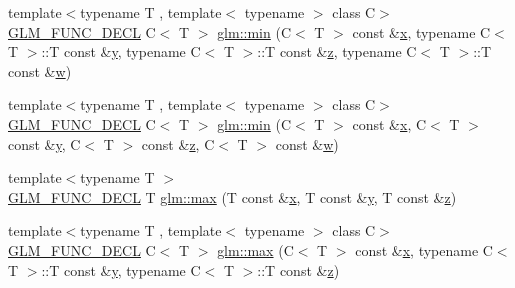 \begin{DoxyCompactItemize}
\item 
{\footnotesize template$<$typename T , template$<$ typename $>$ class C$>$ }\\\hyperlink{setup_8hpp_ab2d052de21a70539923e9bcbf6e83a51}{G\+L\+M\+\_\+\+F\+U\+N\+C\+\_\+\+D\+E\+CL} C$<$ T $>$ \hyperlink{group__gtx__extended__min__max_ga4fe35dd31dd0c45693c9b60b830b8d47}{glm\+::min} (C$<$ T $>$ const \&\hyperlink{_s_d_l__opengl_8h_ad0e63d0edcdbd3d79554076bf309fd47}{x}, typename C$<$ T $>$\+::T const \&\hyperlink{_s_d_l__opengl_8h_a1675d9d7bb68e1657ff028643b4037e3}{y}, typename C$<$ T $>$\+::T const \&\hyperlink{_s_d_l__opengl__glext_8h_a5e74030ebb3297ce1b37ff716fedd68f}{z}, typename C$<$ T $>$\+::T const \&\hyperlink{_s_d_l__opengl__glext_8h_a6ee8f168a7ab6785a9bb57c6715dad99}{w})
\item 
{\footnotesize template$<$typename T , template$<$ typename $>$ class C$>$ }\\\hyperlink{setup_8hpp_ab2d052de21a70539923e9bcbf6e83a51}{G\+L\+M\+\_\+\+F\+U\+N\+C\+\_\+\+D\+E\+CL} C$<$ T $>$ \hyperlink{group__gtx__extended__min__max_ga7471ea4159eed8dd9ea4ac5d46c2fead}{glm\+::min} (C$<$ T $>$ const \&\hyperlink{_s_d_l__opengl_8h_ad0e63d0edcdbd3d79554076bf309fd47}{x}, C$<$ T $>$ const \&\hyperlink{_s_d_l__opengl_8h_a1675d9d7bb68e1657ff028643b4037e3}{y}, C$<$ T $>$ const \&\hyperlink{_s_d_l__opengl__glext_8h_a5e74030ebb3297ce1b37ff716fedd68f}{z}, C$<$ T $>$ const \&\hyperlink{_s_d_l__opengl__glext_8h_a6ee8f168a7ab6785a9bb57c6715dad99}{w})
\item 
{\footnotesize template$<$typename T $>$ }\\\hyperlink{setup_8hpp_ab2d052de21a70539923e9bcbf6e83a51}{G\+L\+M\+\_\+\+F\+U\+N\+C\+\_\+\+D\+E\+CL} T \hyperlink{group__gtx__extended__min__max_ga04991ccb9865c4c4e58488cfb209ce69}{glm\+::max} (T const \&\hyperlink{_s_d_l__opengl_8h_ad0e63d0edcdbd3d79554076bf309fd47}{x}, T const \&\hyperlink{_s_d_l__opengl_8h_a1675d9d7bb68e1657ff028643b4037e3}{y}, T const \&\hyperlink{_s_d_l__opengl__glext_8h_a5e74030ebb3297ce1b37ff716fedd68f}{z})
\item 
{\footnotesize template$<$typename T , template$<$ typename $>$ class C$>$ }\\\hyperlink{setup_8hpp_ab2d052de21a70539923e9bcbf6e83a51}{G\+L\+M\+\_\+\+F\+U\+N\+C\+\_\+\+D\+E\+CL} C$<$ T $>$ \hyperlink{group__gtx__extended__min__max_gae1b7bbe5c91de4924835ea3e14530744}{glm\+::max} (C$<$ T $>$ const \&\hyperlink{_s_d_l__opengl_8h_ad0e63d0edcdbd3d79554076bf309fd47}{x}, typename C$<$ T $>$\+::T const \&\hyperlink{_s_d_l__opengl_8h_a1675d9d7bb68e1657ff028643b4037e3}{y}, typename C$<$ T $>$\+::T const \&\hyperlink{_s_d_l__opengl__glext_8h_a5e74030ebb3297ce1b37ff716fedd68f}{z})

\end{DoxyCompactItemize}
